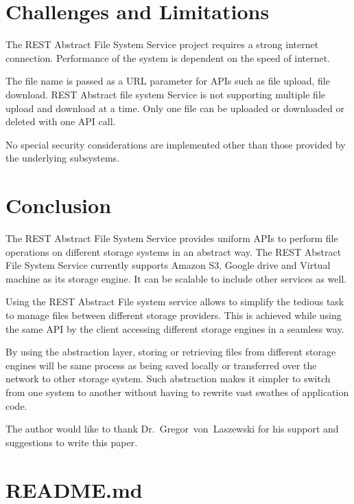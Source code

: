 \section{Challenges and Limitations}

The REST Abstract File System Service project requires a strong
internet connection.  Performance of the system is dependent on the
speed of internet.

The file name is passed as a URL parameter for APIs such as file upload,
file download. REST Abstract file system Service is not supporting 
multiple file upload and download at a time. Only one file can be 
uploaded or downloaded or deleted with one API call. 

No special security considerations are implemented other than those provided
by the underlying subsystems.

\section{Conclusion}

The REST Abstract File System Service provides uniform APIs to perform
file operations on different storage systems in an abstract way. The
REST Abstract File System Service currently supports Amazon S3, Google
drive and Virtual machine as its storage engine. It can be scalable to
include other services as well.


Using the REST Abstract File system service allows to simplify the
tedious task to manage files between different storage providers. This
is achieved while using the same API by the client accessing different
storage engines in a seamless way.


By using the abstraction layer, storing or retrieving files from
different storage engines will be same process as being saved locally
or transferred over the network to other storage system. Such
abstraction makes it simpler to switch from one system to another
without having to rewrite vast swathes of application code.



\begin{acks}

  The author would like to thank Dr.~Gregor~von~Laszewski for his
  support and suggestions to write this paper.

\end{acks}


 

\appendix

\section{README.md}


